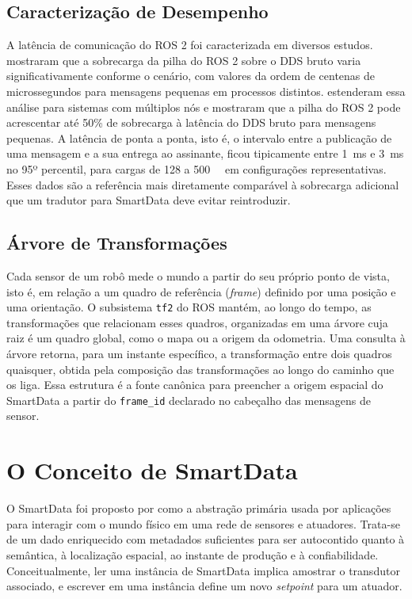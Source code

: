 \documentclass[
    12pt,
    oneside,
    a4paper,
    chapter=TITLE,
    section=TITLE,
    english,
    brazil
]{abntex2}
\begin{document}
\subsection{Caracterização de Desempenho}
A latência de comunicação do ROS 2 foi caracterizada em diversos estudos.
 mostraram que a sobrecarga da pilha do ROS 2
sobre o DDS bruto varia significativamente conforme o cenário, com valores
da ordem de centenas de microssegundos para mensagens pequenas em
processos distintos.  estenderam essa
análise para sistemas com múltiplos nós e mostraram que a pilha do ROS 2
pode acrescentar até 50\% de sobrecarga à latência do DDS bruto para
mensagens pequenas. A latência de ponta a ponta, isto é, o intervalo
entre a publicação de uma mensagem e a sua entrega ao assinante, ficou
tipicamente entre \SI{1}{\milli\second} e \SI{3}{\milli\second} no 95º
percentil, para cargas de \SI{128}{\byte} a \SI{500}{\kilo\byte} em
configurações representativas. Esses dados são a referência mais
diretamente comparável à sobrecarga adicional que um tradutor
para SmartData deve evitar reintroduzir.

\subsection{Árvore de Transformações}
Cada sensor de um robô mede o mundo a partir do seu próprio ponto de
vista, isto é, em relação a um quadro de referência (\textit{frame})
definido por uma posição e uma orientação. O subsistema \texttt{tf2} do
ROS mantém, ao longo do tempo, as transformações que relacionam esses
quadros, organizadas em uma árvore cuja raiz é um quadro global, como o
mapa ou a origem da odometria. Uma consulta à árvore retorna, para um
instante específico, a transformação entre dois quadros quaisquer, obtida
pela composição das transformações ao longo do caminho que os liga. Essa
estrutura é a fonte canônica para preencher a origem espacial do
SmartData a partir do \texttt{frame\_id} declarado no cabeçalho das
mensagens de sensor.

\section{O Conceito de SmartData}
\label{sec:smartdata}

O SmartData foi proposto por  como a
abstração primária usada por aplicações para
interagir com o mundo físico em uma rede de sensores e atuadores. Trata-se
de um dado enriquecido com metadados suficientes para ser autocontido
quanto à semântica, à localização espacial, ao instante de produção e à
confiabilidade. Conceitualmente, ler uma instância de SmartData implica
amostrar o transdutor associado, e escrever em uma instância define um novo
\textit{setpoint} para um atuador.
\end{document}
